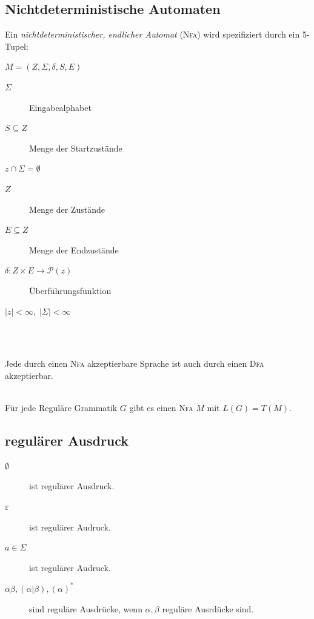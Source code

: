 \documentclass{scrartcl}
\begin{document}
\subsection*{Nichtdeterministische Automaten} %
Ein \emph{nichtdeterministischer, endlicher Automat} (\textsc{Nfa}) wird spezifiziert durch ein 5-Tupel: \\
\begin{minipage}{6cm}
    $M = \left(Z,\Sigma,\delta,S,E\right)$
    \begin{description}
        \item[$\Sigma$] Eingabealphabet
        \item[$S\subseteq Z$] Menge der Startzustände
        \item[$z\cap\Sigma = \emptyset$]
    \end{description}
\end{minipage}
\begin{minipage}{7cm}
\begin{description}
    \item[$Z$] Menge der Zustände
    \item[$E\subseteq Z$] Menge der Endzustände
    \item[$\delta: Z\times E\to \mathcal{P}(z)$] Überführungsfunktion
    \item[$|z|< \infty,\; |\Sigma |<\infty$]
\end{description}
\end{minipage}\\

\begin{shaded}
    \ \\Jede durch einen \textsc{Nfa} akzeptierbare Sprache ist auch durch einen \textsc{Dfa} akzeptierbar.
\end{shaded}

\begin{shaded}
    \ \\Für jede Reguläre Grammatik $G$ gibt es einen \textsc{Nfa} $M$ mit $L(G)=T(M)$.
\end{shaded}

\subsection*{regulärer Ausdruck} %
\begin{description}
    \item[$\emptyset$] ist regulärer Ausdruck.
    \item[$\varepsilon$] ist regulärer Audruck.
    \item[$a\in\Sigma$] ist regulärer Audruck.
    \item[$\alpha\beta, \left(\alpha\vert\beta\right), \left(\alpha\right)^* $] sind reguläre Ausdrücke, wenn $\alpha,\beta$ reguläre Ausrdücke sind.
\end{description}
\end{document}
